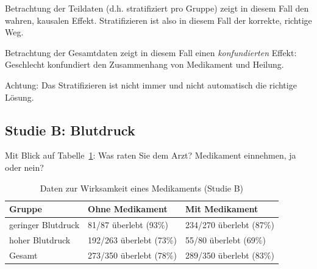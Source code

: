 \documentclass[
  a4paper,
  DIV=11]{scrreprt}
\theoremstyle{definition}
\theoremstyle{remark}
\begin{document}
\begin{tcolorbox}[enhanced jigsaw, colframe=quarto-callout-important-color-frame, title=\textcolor{quarto-callout-important-color}{\faExclamation}\hspace{0.5em}{Wichtig}, breakable, leftrule=.75mm, coltitle=black, toptitle=1mm, bottomrule=.15mm, bottomtitle=1mm, opacityback=0, arc=.35mm, rightrule=.15mm, left=2mm, colbacktitle=quarto-callout-important-color!10!white, opacitybacktitle=0.6, toprule=.15mm, titlerule=0mm, colback=white]
Betrachtung der Teildaten (d.h. stratifiziert pro Gruppe) zeigt in
diesem Fall den wahren, kausalen Effekt. Stratifizieren ist also in
diesem Fall der korrekte, richtige Weg.
\end{tcolorbox}

Betrachtung der Gesamtdaten zeigt in diesem Fall einen
\emph{konfundierten} Effekt: Geschlecht konfundiert den Zusammenhang von
Medikament und Heilung.

\begin{tcolorbox}[enhanced jigsaw, colframe=quarto-callout-important-color-frame, title=\textcolor{quarto-callout-important-color}{\faExclamation}\hspace{0.5em}{Wichtig}, breakable, leftrule=.75mm, coltitle=black, toptitle=1mm, bottomrule=.15mm, bottomtitle=1mm, opacityback=0, arc=.35mm, rightrule=.15mm, left=2mm, colbacktitle=quarto-callout-important-color!10!white, opacitybacktitle=0.6, toprule=.15mm, titlerule=0mm, colback=white]
Achtung: Das Stratifizieren ist nicht immer und nicht automatisch die
richtige Lösung.
\end{tcolorbox}

\hypertarget{studie-b-blutdruck}{%
\subsection{Studie B: Blutdruck}\label{studie-b-blutdruck}}

Mit Blick auf Tabelle~\ref{tbl-studie-b}: Was raten Sie dem Arzt?
Medikament einnehmen, ja oder nein?

\hypertarget{tbl-studie-b}{}
\begin{longtable}{lll}
\caption{\label{tbl-studie-b}Daten zur Wirksamkeit eines Medikaments (Studie B) }\tabularnewline

\toprule
Gruppe & Ohne Medikament & Mit Medikament \\ 
\midrule
geringer Blutdruck & 81/87 überlebt (93\%) & 234/270 überlebt (87\%) \\ 
hoher Blutdruck & 192/263 überlebt (73\%) & 55/80 überlebt (69\%) \\ 
Gesamt & 273/350 überlebt (78\%) & 289/350 überlebt (83\%) \\ 
\bottomrule
\end{longtable}
\end{document}
